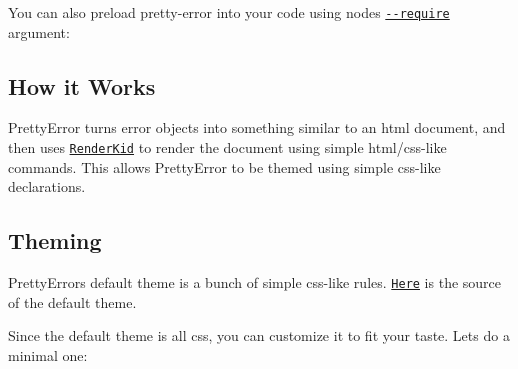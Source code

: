 You can also preload pretty-\/error into your code using node\textquotesingle{}s \href{https://nodejs.org/api/cli.html#cli_r_require_module}{\tt {\ttfamily -\/-\/require}} argument\+:




\subsection*{How it Works}

Pretty\+Error turns error objects into something similar to an html document, and then uses \href{https://github.com/AriaMinaei/renderkid}{\tt Render\+Kid} to render the document using simple html/css-\/like commands. This allows Pretty\+Error to be themed using simple css-\/like declarations.

\subsection*{Theming}

Pretty\+Error\textquotesingle{}s default theme is a bunch of simple css-\/like rules. \href{https://github.com/AriaMinaei/pretty-error/blob/master/src/defaultStyle.coffee}{\tt Here} is the source of the default theme.

Since the default theme is all css, you can customize it to fit your taste. Let\textquotesingle{}s do a minimal one\+:


